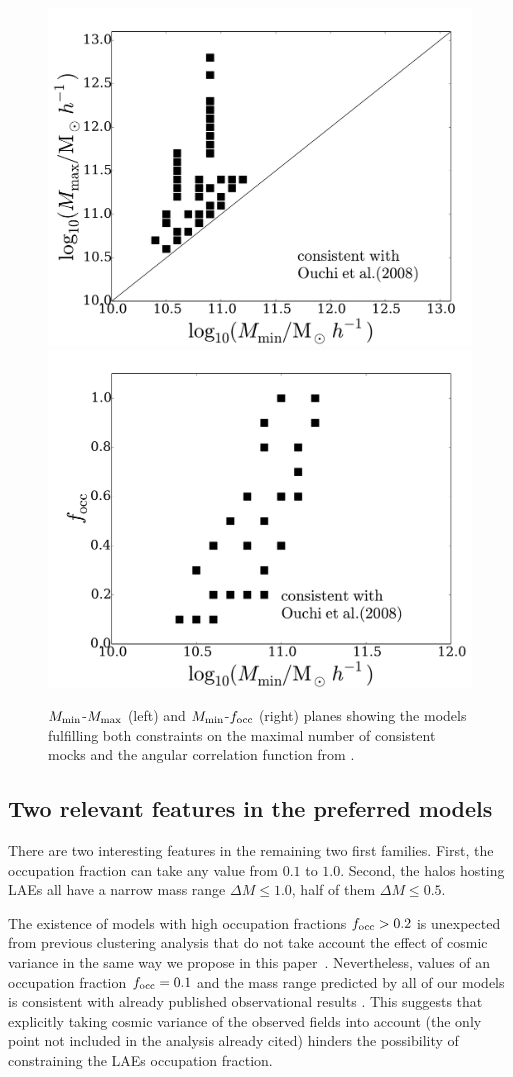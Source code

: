 \documentclass{emulateapj}
\newcommand{\documentname}{paper~}
\begin{document}
\begin{figure}
\begin{center}
\includegraphics[width=0.45\linewidth,angle=0]{Fig6_mass.pdf}
\hspace{5mm}
\includegraphics[width=0.45\linewidth,angle=0]{Fig6_f_occ.pdf}
\end{center}
\caption{$M_{\rm min}$-$M_{\rm max}$ (left) and $M_{\rm
    min}$-$f_{\rm occ}$ (right) planes showing the models fulfilling both
   constraints on the maximal number of consistent mocks and the
  angular correlation function from \citet{Ouchi2008,Ouchi2010}.   
  \label{fig:restriction_mock_and_f_occ_corr}} 
\end{figure} 


\subsection{Two relevant features in the preferred models}
There are two interesting features in the remaining two first
families. First, the occupation fraction can take any value from $0.1$
to $1.0$. Second, the halos hosting LAEs all have a narrow mass range
$\Delta M\leq 1.0$, half of them $\Delta M\leq 0.5$.


The existence of models with high occupation fractions $f_{\rm
    occ}>0.2$ is unexpected from previous clustering analysis that do
  not take  account the effect of cosmic variance in the same way we
  propose in this \documentname. Nevertheless, values of an occupation
  fraction $f_{\rm occ}=0.1$ and the mass range
  predicted by all of our models is consistent with already published
  observational results \citep{Gawiser07,Ouchi2010}. This suggests
  that explicitly taking cosmic variance of the observed fields into
  account (the only point not included in the analysis already cited)
  hinders the possibility of constraining the LAEs occupation
  fraction.
\end{document}
